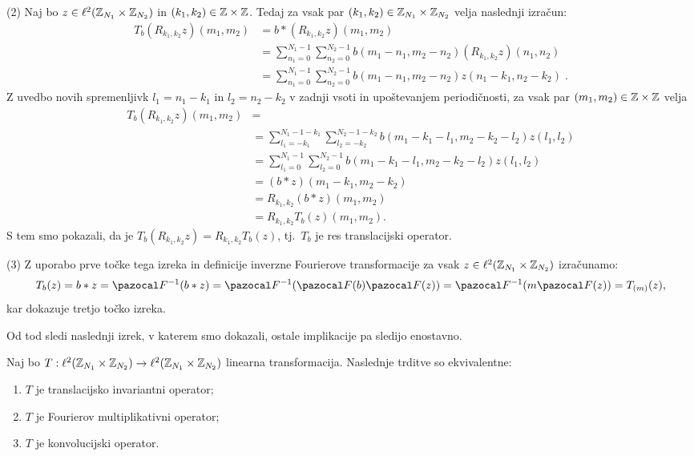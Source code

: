 \begin{dokaz}
(2) Naj bo $z \in \ell^2(\mathbb Z_{N_1} \times \mathbb Z_{N_2})$ in $(k_1, k_2) \in \mathbb Z \times \mathbb Z$. Tedaj za vsak par $(k_1, k_2) \in \mathbb Z_{N_1} \times \mathbb Z_{N_2}$ velja naslednji izračun:
%
\begin{align*}
T_b(R_{k_1, k_2}z)(m_1, m_2) & = b \ast (R_{k_1, k_2}z)(m_1, m_2) \\
& =  \sum_{n_1 = 0}^{N_1 - 1} \sum_{n_2 = 0}^{N_2 - 1} b(m_1 - n_1, m_2 - n_2) (R_{k_1, k_2}z)(n_1, n_2) \\
& =  \sum_{n_1 = 0}^{N_1 - 1} \sum_{n_2 = 0}^{N_2 - 1} b(m_1 - n_1, m_2 - n_2) z(n_1 - k_1, n_2 - k_2) \;.
\end{align*}
%
Z uvedbo novih spremenljivk $l_1 = n_1 - k_1$ in $l_2 = n_2 - k_2$ v zadnji vsoti in upoštevanjem periodičnosti, za vsak par $(m_1, m_2) \in \mathbb Z \times \mathbb Z$ velja
%
\begin{align*}
T_b(R_{k_1, k_2}z)(m_1, m_2) & = \\
& = \sum_{l_1 = -k_1}^{N_1 - 1 - k_1} \sum_{l_2 = -k_2}^{N_2 - 1 - k_2} b(m_1 - k_1 - l_1, m_2 - k_2 - l_2) z(l_1, l_2) \\
& = \sum_{l_1 = 0}^{N_1 - 1} \sum_{l_2 = 0}^{N_2 - 1} b(m_1 - k_1 - l_1, m_2 - k_2 - l_2) z(l_1, l_2) \\
& = (b \ast z)(m_1 - k_1, m_2 - k_2) \\
& = R_{k_1, k_2}(b \ast z)(m_1, m_2) \\
& = R_{k_1, k_2}T_b(z)(m_1, m_2).
\end{align*}
%
S tem smo pokazali, da je $T_b(R_{k_1, k_2}z) = R_{k_1, k_2}T_b(z)$, tj.\ $T_b$ je res translacijski operator.

(3) Z uporabo prve točke tega izreka in definicije inverzne Fourierove transformacije za vsak $z \in \ell^2(\mathbb Z_{N_1} \times \mathbb Z_{N_2})$ izračunamo:
%
\begin{equation*}
T_b(z) = b \ast z = \F^{-1}(b \ast z) = \F^{-1}(\F(b) \F(z)) = \F^{-1}(m \F(z)) = T_{(m)}(z),
\end{equation*}
%
kar dokazuje tretjo točko izreka.
\end{dokaz}
%
Od tod sledi naslednji izrek, v katerem smo dokazali, ostale implikacije pa sledijo enostavno. %
%
\begin{izrek}
Naj bo $T : \ell^2(\mathbb Z_{N_1} \times \mathbb Z_{N_2}) \to \ell^2(\mathbb Z_{N_1} \times \mathbb Z_{N_2})$ linearna transformacija. Naslednje trditve so ekvivalentne:
%
\begin{enumerate}
  \item $T$ je translacijsko invariantni operator;
  \item $T$ je Fourierov multiplikativni operator;
  \item $T$ je konvolucijski operator.
\end{enumerate}
%
\end{izrek}
